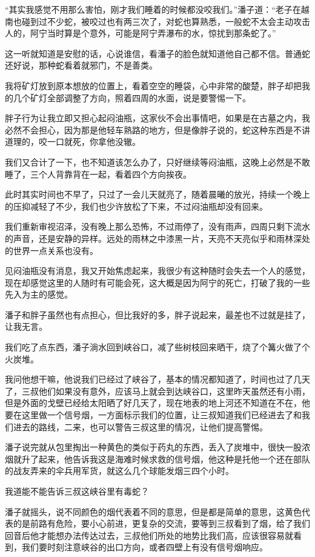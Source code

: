 “其实我感觉不用那么害怕，刚才我们睡着的时候都没咬我们。”潘子道：“老子在越南也碰到过不少蛇，被咬过也有两三次了，对蛇也算熟悉，一般蛇不太会主动攻击人的，阿宁当时算是个意外，可能是阿宁弄瀑布的水，惊扰到那条蛇了。”

这一听就知道是安慰的话，心说谁信，看潘子的脸色就知道他自己都不信。普通蛇还好说，那种蛇看着就邪门，不是善类。

我将矿灯放到原本想放的位置上，看着空空的睡袋，心中非常的酸楚，胖子却把我的几个矿灯全部调整了方向，照着四周的水面，说是要警惕一下。

胖子行为让我立即又担心起闷油瓶，这家伙不会出事情吧，如果是在古墓之内，我必然不会担心，因为那是他轻车熟路的地方，但是像胖子说的，蛇这种东西是不讲道理的，咬一口就死，你拿他没辙。

我们又合计了一下，也不知道该怎么办了，只好继续等闷油瓶，这晚上必然是不敢睡了，三个人背靠背在一起，看着四个方向挨夜。

此时其实时间也不早了，只过了一会儿天就亮了，随着晨曦的放光，持续一个晚上的压抑减轻了不少，我们也少许放松了下来，不过闷油瓶却没有回来。

我们重新审视沼泽，没有晚上那么恐怖，不过雨停了，没有雨声，四周只剩下流水的声音，还是安静的异样。远处的雨林之中漆黑一片，天亮不天亮似乎和雨林深处的世界一点关系也没有。

见闷油瓶没有消息，我又开始焦虑起来，我很少有这种随时会失去一个人的感觉，现在却感觉这里的人随时有可能会死，这大概是因为阿宁的死亡，打破了我的一些先入为主的感觉。

潘子和胖子虽然也有点担心，但比我好的多，胖子说起来，最差也不过就是挂了，让我无言。

我们吃了点东西，潘子淌水回到峡谷口，减了些树枝回来晒干，烧了个篝火做了个火炭堆。

我问他想干嘛，他说我们已经过了峡谷了，基本的情况都知道了，时间也过了几天了，三叔他们如果没有意外，应该马上就会到达峡谷口，这里昨天虽然还有小雨，但是外面的戈壁已经给太阳晒了好几天了，现在地表的地上河还不知道在不在，他要在这里做一个信号烟，一方面标示我们的位置，让三叔知道我们已经进去了和我们进去的路线，二来，也可以警告三叔这里的情况，让他们提高警惕。

潘子说完就从包里掏出一种黄色的类似于药丸的东西，丢入了炭堆中，很快一股浓烟就升了起来，他告诉我这是海难时候求救的信号烟，他这种是托他一个还在部队的战友弄来的伞兵用军货，就这么几个球能发烟三四个小时。

我道能不能告诉三叔这峡谷里有毒蛇？

潘子就摇头，说不同颜色的烟代表着不同的意思，但是都是简单的意思，这黄色代表的是前路有危险，要小心前进，更复杂的交流，要等到三叔看到了烟，给了我们回音后他才能想办法传达过去，三叔他们所处的地势比我们高，应该很容易就看到，我们要时刻注意峡谷的出口方向，或者四壁上有没有信号烟响应。


